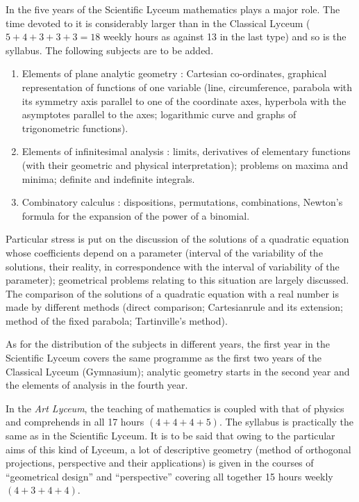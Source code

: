 In the five years of the Scientific Lyceum mathematics plays a major role. The time devoted to it is considerably larger than in the Classical Lyceum ($5+4+3+3+3=18$ weekly hours as against 13 in the last type) and so is the syllabus. The following subjects are to be added.
\begin{enumerate}
\item Elements of plane analytic geometry : Cartesian co-ordinates, graphical representation of functions of one variable (line, circumference, parabola with its symmetry axis parallel to one of the coordinate axes, hyperbola with the asymptotes parallel to the axes; logarithmic curve and graphs of trigonometric functions).

\item Elements of infinitesimal analysis : limits, derivatives of elementary functions (with their geometric and physical interpretation); problems on maxima and minima; definite and indefinite integrals.

\item Combinatory calculus : dispositions, permutations, combinations, Newton's formula for the expansion of the power of a binomial.
\end{enumerate}

Particular stress is put on the discussion of the solutions of a quadratic equation whose coefficients depend on a parameter (interval of the variability of the solutions, their reality, in correspondence with the interval of variability of the parameter); geometrical problems relating to this situation are largely discussed. The comparison of the solutions of a quadratic equation with a real number is made by different methods (direct comparison; Cartesian\pageoriginale rule and its extension; method of the fixed parabola; Tartinville's method).

As for the distribution of the subjects in different years, the first year in the Scientific Lyceum covers the same programme as the first two years of the Classical Lyceum (Gymnasium); analytic geometry starts in the second year and the elements of analysis in the fourth year.

In the {\em Art Lyceum}, the teaching of mathematics is coupled with that of physics and comprehends in all 17 hours $(4+4+4+5)$. The syllabus is practically the same as in the Scientific Lyceum. It is to be said that owing to the particular aims of this kind of Lyceum, a lot of descriptive geometry (method of orthogonal projections, perspective and their applications) is given in the courses of ``geometrical design'' and ``perspective'' covering all together 15 hours weekly $(4+3+4+4)$.

